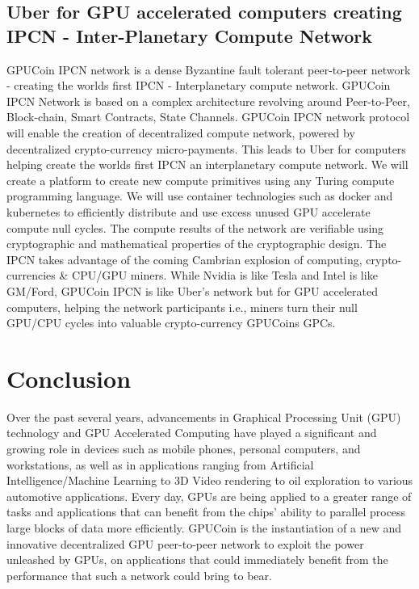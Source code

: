 \documentclass{article}
\begin{document}
\subsection{Uber for GPU accelerated computers creating IPCN - Inter-Planetary Compute Network}
GPUCoin IPCN network is a dense Byzantine fault tolerant peer-to-peer network - creating the worlds first IPCN - Interplanetary compute network. GPUCoin IPCN Network is based on a complex architecture revolving around Peer-to-Peer, Block-chain, Smart Contracts, State Channels. GPUCoin IPCN network protocol will enable the creation of decentralized compute network, powered by decentralized crypto-currency micro-payments. This leads to Uber for computers helping create the worlds first IPCN an interplanetary compute network. We will create a platform to create new compute primitives using any Turing compute programming language. We will use container technologies such as docker and kubernetes to efficiently distribute and use excess unused GPU accelerate compute null cycles. The compute results of the network are verifiable using cryptographic and mathematical properties of the cryptographic design. The IPCN takes advantage of the coming Cambrian explosion of computing, crypto-currencies \& CPU/GPU miners. While Nvidia is like Tesla and Intel is like GM/Ford, GPUCoin IPCN is like Uber's network but for GPU accelerated computers, helping the network participants i.e., miners turn their null GPU/CPU cycles into valuable crypto-currency GPUCoins GPCs.


\section{Conclusion}

Over the past several years, advancements in Graphical Processing Unit (GPU) technology and GPU Accelerated Computing have played a significant and growing role in devices such as mobile phones, personal computers, and workstations, as well as in applications ranging from Artificial Intelligence/Machine Learning to 3D Video rendering to oil exploration to various automotive applications.  Every day, GPUs are being applied to a greater range of tasks and applications that can benefit from the chips’ ability to parallel process large blocks of data more efficiently.  GPUCoin is the instantiation of a new and innovative decentralized GPU peer-to-peer network to exploit the power unleashed by GPUs, on applications that could immediately benefit from the performance that such a network could bring to bear.  
\end{document}
